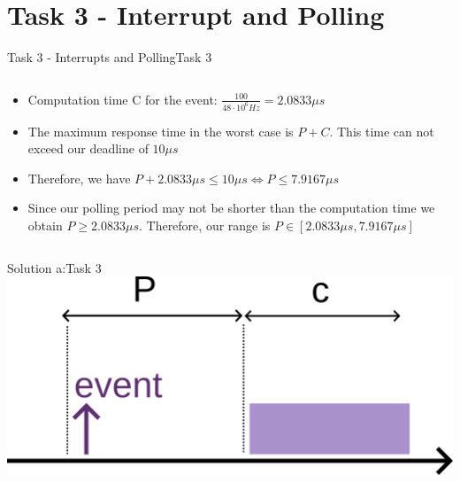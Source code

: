 
\section{Task 3 - Interrupt and Polling}

\begin{frame}[fragile]{Task 3 - Interrupts and Polling}{Task 3}
  \begin{solution}
    \begin{columns}
      \begin{column}{0.8\textwidth}
        \begin{itemize}
          \item Computation time C for the event: $\frac{100}{48 \cdot 10^6 Hz} = 2.0833\mu s$
          \item The maximum response time in the worst case is $P + C$. This time can not exceed our deadline of $10 \mu s$
          \item Therefore, we have $P + 2.0833\mu s \leq 10\mu s \Longleftrightarrow P \leq 7.9167\mu s$
          \item Since our polling period may not be shorter than the computation time we obtain $P \geq 2.0833\mu s$. Therefore, our range is $P \in [2.0833\mu s, 7.9167\mu s]$
        \end{itemize}
      \end{column}
    \end{columns}
  \end{solution}
\end{frame}

\begin{frame}{Solution a:}{Task 3}
    \includegraphics[]{figures/task3-a.png}
\end{frame}

